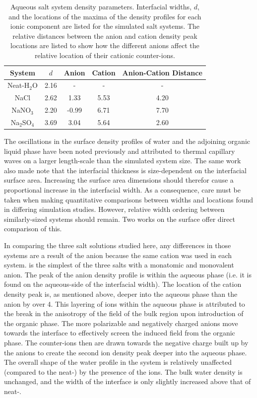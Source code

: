 \begin{table}[htdp]
	\begin{center}
	\begin{tabular}{|c||c|c|c|c|}
		\hline
		System & $d$ & Anion & Cation & Anion-Cation Distance \\ \hline
		Neat-H$_2$O & 2.16 & - & - & - \\ 
		NaCl & 2.62 & 1.33 & 5.53 & 4.20 \\
		NaNO$_3$ & 2.20 & -0.99 & 6.71 & 7.70 \\
		Na$_2$SO$_4$ & 3.69 & 3.04 & 5.64 & 2.60 \\
		\hline
	\end{tabular}
	\end{center}
	\caption{Aqueous salt system density parameters. Interfacial widths, $d$, and the locations of the maxima of the density profiles for each ionic component are listed for the simulated salt systems. The relative distances between the anion and cation density peak locations are listed to show how the different anions affect the relative location of their cationic counter-ions.}
	\label{table:double-layer}
\end{table}

The oscillations in the surface density profiles of water and the adjoining organic \ctc liquid phase have been noted previously and attributed to thermal capillary waves on a larger length-scale than the simulated system size.\cite{Chang1996} The same work also made note that the interfacial thickness is size-dependent on the interfacial surface area. Increasing the surface area dimensions should therefor cause a proportional increase in the interfacial width. As a consequence, care must be taken when making quantitative comparisons between widths and locations found in differing simulation studies. However, relative width ordering between similarly-sized systems should remain. Two works on the \ctcwat surface offer direct comparison of this.\cite{Chang1996,Hore2008}

In comparing the three salt solutions studied here, any differences in those systems are a result of the anion because the same cation was used in each system. \nacl is the simplest of the three salts with a monatomic and monovalent anion. The peak of the anion density profile is within the aqueous phase (i.e. it is found on the aqueous-side of the interfacial width). The location of the cation density peak is, as mentioned above, deeper into the aqueous phase than the anion by over 4\angs. This layering of ions within the aqueous phase is attributed to the break in the anisotropy of the field of the bulk region upon introduction of the organic phase. The more polarizable and negatively charged anions move towards the interface to effectively screen the induced field from the organic phase. The counter-ions then are drawn towards the negative charge built up by the anions to create the second ion density peak deeper into the aqueous phase. The overall shape of the water profile in the \nacl system is relatively unaffected (compared to the neat-\wat) by the presence of the ions. The bulk water density is unchanged, and the width of the interface is only slightly increased above that of neat-\wat.

